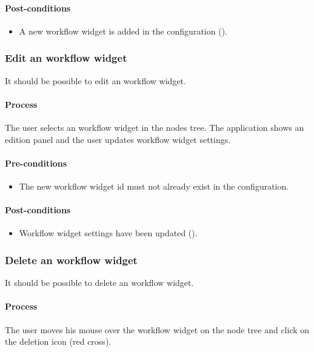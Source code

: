 \documentclass[11pt,a4paper,oneside]{article}
\begin{document}
\paragraph{Post-conditions}
\begin{itemize}
	\item A new workflow widget is added in the configuration ().
\end{itemize}

\subsubsection{Edit an workflow widget}
It should be possible to edit an workflow widget.

\paragraph{Process}
The user selects an workflow widget in the nodes tree. The application shows an edition panel and the user updates workflow widget settings.

\paragraph{Pre-conditions}
\begin{itemize}
	\item The new workflow widget id must not already exist in the configuration.
\end{itemize}

\paragraph{Post-conditions}
\begin{itemize}
	\item Workflow widget settings have been updated ().
\end{itemize}

\subsubsection{Delete an workflow widget}
It should be possible to delete an workflow widget.

\paragraph{Process}
The user moves his mouse over the workflow widget on the node tree and click on the deletion icon (red cross).
\end{document}
